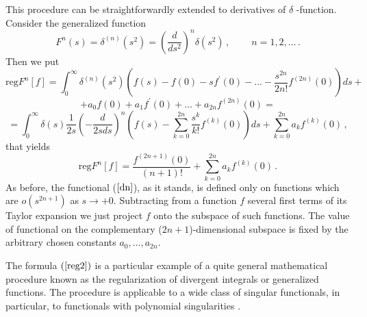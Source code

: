 \documentclass[a4paper,12pt]{article}
\begin{document}
This procedure can be straightforwardly extended to derivatives of $\delta$%
-function. Consider the generalized function
\begin{equation}  \label{dn}
F^n(s)=\delta^{(n)}(s^2)=\left(\frac{d}{ds^2}\right)^n
\delta(s^2)\,,\;\;\;\;\;\;\;\; n=1,2,\ldots\,.
\end{equation}
Then we put
\begin{equation}  \label{reg1}
\text{reg}F^n[f]=\int_{0}^{\infty}
\delta^{(n)}(s^2)\left(f(s)-f(0)-sf^{\prime}(0)-\ldots -\frac
{s^{2n}}{2n!}f^{(2n)}(0) \right)ds+
\end{equation}
\begin{equation*}
+a_0f(0)+a_1f^{\prime}(0)+\ldots +a_{2n}f^{(2n)}(0)=
\end{equation*}
\begin{equation*}
=\int_0^{\infty}\delta(s)\frac1{2s}\left(-\frac{d}{2sds}\right)^n\left(f(s)-%
\sum_{k=0}^{2n} \frac{s^k}{k!}f^{(k)}(0)\right)ds+%
\sum_{k=0}^{2n}a_{k}f^{(k)}(0)\,,
\end{equation*}
that yields
\begin{equation}  \label{reg2}
\text{reg}F^n[f]=\frac{f^{(2n+1)}(0)}{(n+1)!}+\sum_{k=0}^{2n}a_{k}f^{(k)}(0)%
\,.
\end{equation}
As before, the functional ($\ref{dn}$), as it stands, is defined only on
functions which are $o(s^{2n+1})$ as $s\rightarrow +0$. Subtracting from a
function $f$ several first terms of its Taylor expansion we just project $f$
onto the subspace of such functions. The value of functional on the
complementary ($2n+1$)-dimensional subspace is fixed by the arbitrary chosen
constants $a_0, \ldots, a_{2n}$.

The formula $(\ref{reg2})$ is a particular example of a quite general
mathematical procedure known as the regularization of divergent integrals or
generalized functions. The procedure is applicable to a wide class of
singular functionals, in particular, to functionals with polynomial
singularities \cite{GSh}.
\end{document}
